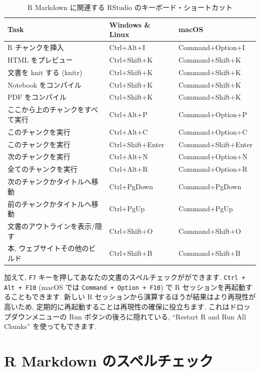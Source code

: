 \documentclass[
  11pt,
  lualatex,ja=standard,jafont=noto]{bxjsreport}
\begin{document}
\begin{table}

\caption{\label{tab:shortcuts}R Markdown に関連する RStudio のキーボード・ショートカット}
\centering
\begin{tabular}[t]{lll}
\toprule
Task & Windows \& Linux & macOS\\
\midrule
R チャンクを挿入 & Ctrl+Alt+I & Command+Option+I\\
HTML をプレビュー & Ctrl+Shift+K & Command+Shift+K\\
文書を knit する (knitr) & Ctrl+Shift+K & Command+Shift+K\\
Notebook をコンパイル & Ctrl+Shift+K & Command+Shift+K\\
PDF をコンパイル & Ctrl+Shift+K & Command+Shift+K\\
\addlinespace
ここから上のチャンクをすべて実行 & Ctrl+Alt+P & Command+Option+P\\
このチャンクを実行 & Ctrl+Alt+C & Command+Option+C\\
このチャンクを実行 & Ctrl+Shift+Enter & Command+Shift+Enter\\
次のチャンクを実行 & Ctrl+Alt+N & Command+Option+N\\
全てのチャンクを実行 & Ctrl+Alt+R & Command+Option+R\\
\addlinespace
次のチャンクかタイトルへ移動 & Ctrl+PgDown & Command+PgDown\\
前のチャンクかタイトルへ移動 & Ctrl+PgUp & Command+PgUp\\
文書のアウトラインを表示/隠す & Ctrl+Shift+O & Command+Shift+O\\
本, ウェブサイトその他のビルド & Ctrl+Shift+B & Command+Shift+B\\
\bottomrule
\end{tabular}
\end{table}

加えて, \texttt{F7} キーを押してあなたの文書のスペルチェックがができます. \texttt{Ctrl + Alt + F10} (macOS では \texttt{Command + Option + F10}) で R セッションを再起動することもできます. 新しい R セッションから演算するほうが結果はより再現性が高いため, 定期的に再起動することは再現性の確保に役立ちます. これはドロップダウンメニューの Run ボタンの後ろに隠れている, ``Restart R and Run All Chunks'' を使ってもできます.

\hypertarget{spell-check}{%
\section{R Markdown のスペルチェック}\label{spell-check}}
\end{document}
